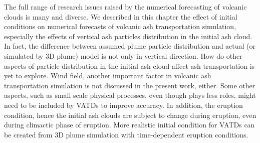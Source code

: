 The full range of research issues raised by the numerical forecasting of volcanic clouds is many and diverse. We described in this chapter the effect of initial conditions on numerical forecasts of volcanic ash transportation simulation, especially the effects of vertical ash particles distribution in the initial ash cloud. 
In fact, the difference between assumed plume particle distribution and actual (or simulated by 3D plume) model is not only in vertical direction. How do other aspects of particle distribution in the initial ash cloud affect ash transportation is yet to explore. Wind field, another important factor in volcanic ash transportation simulation is not discussed in the present work, either. Some other aspects, such as small scale physical processes, even though plays less roles, might need to be included by VATDs to improve accuracy. In addition, the eruption condition, hence the initial ash clouds are subject to change during eruption, even during climactic phase of eruption. More realistic initial condition for VATDs can be created from 3D plume simulation with time-dependent eruption conditions.
